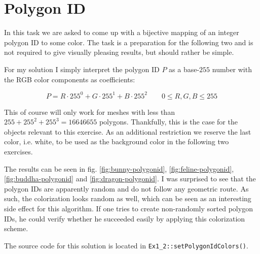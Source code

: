 \documentclass[a4paper,10pt,notitlepage]{scrreprt}
\begin{document}
\pagebreak

\section{Polygon ID}

In this task we are asked to come up with a bijective mapping of an integer
polygon ID to some color. The task is a preparation for the following two and
is not required to give visually pleasing results, but should rather be simple.

For my solution I simply interpret the polygon ID $P$ as a base-$255$ number
with the RGB color components as coefficients:

\begin{equation}
 P = R \cdot 255^0 + G \cdot 255^1 + B \cdot 255^2 \qquad 0 \leq R,G,B \leq
255
 \label{eq:polygonid}
\end{equation}

This of course will only work for meshes with less than
$255+255^2+255^3=16646655$ polygons. Thankfully, this is the case for the
objects relevant to this exercise. As an additional restriction we reserve the
last color, i.e. white, to be used as the background color in the following two
exercises.

The results can be seen in fig. \ref{fig:bunny-polygonid},
\ref{fig:feline-polygonid}, \ref{fig:buddha-polygonid} and
\ref{fig:dragon-polygonid}. I was
surprised to see that the polygon IDs are apparently random and do not follow
any geometric route. As such, the colorization looks random as well, which can
be seen as an interesting side effect for this algorithm. If one tries to
create non-randomly sorted polygon IDs, he could verify whether he succeeded
easily by applying this colorization scheme.

The source code for this solution is located in
\texttt{Ex1\_2::setPolygonIdColors()}.
\end{document}
